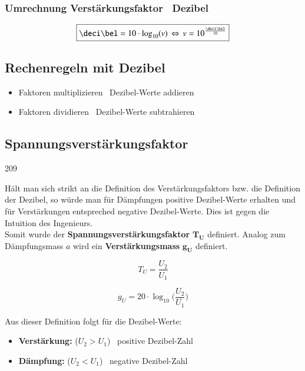 \subsubsection{Umrechnung Verstärkungsfaktor \textlrarrow\ Dezibel}

$$ \boxed{ \deci\bel = 10 \cdot \log_{10} (v) \, \Leftrightarrow \, v = 10^{\frac{\deci\bel}{10}} } $$


\subsection{Rechenregeln mit Dezibel}

\begin{itemize}
    \item Faktoren multiplizieren \textrightarrow\ Dezibel-Werte addieren
    \item Faktoren dividieren \textrightarrow\ Dezibel-Werte subtrahieren
\end{itemize}


\subsection{Spannungsverstärkungsfaktor}{209}

Hält man sich strikt an die Definition des Verstärkungsfaktors bzw. die Definition der Dezibel, so würde man für Dämpfungen positive
Dezibel-Werte erhalten und für Verstärkungen entspreched negative Dezibel-Werte. Dies ist gegen die Intuition des Ingenieurs. \\
Somit wurde der \textbf{Spannungsverstärkungsfaktor} $\bm{T_{U}}$ definiert. Analog zum Dämpfungsmass $a$ wird ein 
\textbf{Verstärkungsmass} $\bm{g_{U}}$ definiert.

\begin{minipage}[c]{0.48\columnwidth}
    $$ \boxed{ T_U = \frac{U_2}{U_1} } $$
\end{minipage}
\hfill
\begin{minipage}[c]{0.48\columnwidth}
    $$ \boxed{ g_U = 20 \cdot \log_{10} \Big( \frac{U_2}{U_1} \Big) } $$
\end{minipage}


Aus dieser Definition folgt für die Dezibel-Werte:

\begin{itemize}
    \item \textbf{Verstärkung: } ($U_2 > U_1$) \textrightarrow\ positive Dezibel-Zahl
    \item \textbf{Dämpfung: } ($U_2 < U_1$) \textrightarrow\ negative Dezibel-Zahl
\end{itemize}


